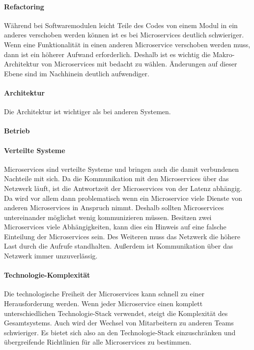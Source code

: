 \paragraph{Refactoring}

Während bei Softwaremodulen leicht Teile des Codes von einem Modul in ein anderes verschoben werden können ist es bei Microservices deutlich schwieriger. Wenn eine Funktionalität in einen anderen Microservice verschoben werden muss, dann ist ein höherer Aufwand erforderlich. Deshalb ist es wichtig die Makro-Architektur von Microservices mit bedacht zu wählen. Änderungen auf dieser Ebene sind im Nachhinein deutlich aufwendiger.

\paragraph{Architektur}

Die Architektur ist wichtiger als bei anderen Systemen.

\paragraph{Betrieb}



\paragraph{Verteilte Systeme}

Microservices sind verteilte Systeme und bringen auch die damit verbundenen Nachteile mit sich. Da die Kommunikation mit den Microservices über das Netzwerk läuft, ist die Antwortzeit der Microservices von der Latenz abhängig. Da wird vor allem dann problematisch wenn ein Microservice viele Dienste von anderen Microservices in Anspruch nimmt. Deshalb sollten Microservices untereinander möglichst wenig kommunizieren müssen. Besitzen zwei Microservices viele Abhängigkeiten, kann dies ein Hinweis auf eine falsche Einteilung der Microservices sein. Des Weiteren muss das Netzwerk die höhere Last durch die Aufrufe standhalten. Außerdem ist Kommunikation über das Netzwerk immer unzuverlässig.

\paragraph{Technologie-Komplexität}

Die technologische Freiheit der Microservices kann schnell zu einer Herausforderung werden. Wenn jeder Microservice einen komplett unterschiedlichen Technologie-Stack verwendet, steigt die Komplexität des Gesamtsystems. Auch wird der Wechsel von Mitarbeitern zu anderen Teams schwieriger. Es bietet sich also an den Technologie-Stack einzuschränken und übergreifende Richtlinien für alle Microservices zu bestimmen.

